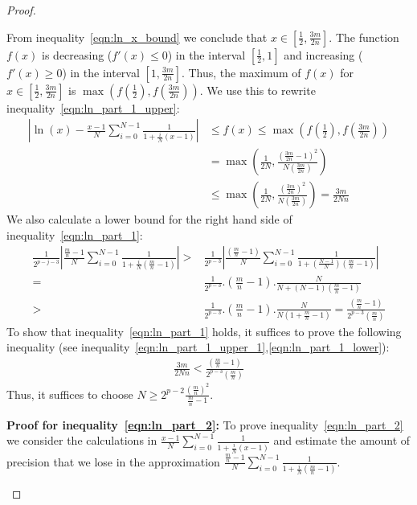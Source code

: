 \documentclass{article}
\numberwithin{mytheorem}{section}
\newcommand{\lnsumu}[2] {\frac{#1-1}{#2} \sum_{i=0}^{#2-1}\frac{1}{1+\frac{i}{#2}(#1-1)}}
\begin{document}
\begin{proof}
\begin{enumerate}[i.]
From inequality~\eqref{eqn:ln_x_bound} we conclude that $x\in [\frac{1}{2},\frac{3m}{2n}]$. The function $f(x)$ is decreasing ($f'(x)\leq 0$) in the interval $[\frac{1}{2},1]$ and increasing ($f'(x)\geq 0$) in the interval $[1,\frac{3m}{2n}]$. Thus, the maximum of $f(x)$ for $x\in [\frac{1}{2},\frac{3m}{2n}]$ is $\max (f(\frac{1}{2}),f(\frac{3m}{2n}))$. We use this to rewrite inequality~\eqref{eqn:ln_part_1_upper}:
\begin{align}
|\ln(x)-\lnsumu{x}{N}|&\leq f(x)\leq \max (f(\frac{1}{2}),f(\frac{3m}{2n}))\nonumber \\ 
&=\max(\frac{1}{2N},\frac{(\frac{3m}{2n}-1)^2}{N(\frac{3m}{2n})})\nonumber\\
&\leq \max (\frac{1}{2N},\frac{(\frac{3m}{2n})^2}{N(\frac{3m}{2n})})=\frac{3m}{2Nn}\label{eqn:ln_part_1_upper_1}
\end{align}
We also calculate a lower bound for the right hand side of inequality~\eqref{eqn:ln_part_1}:
\begin{align}
\frac{1}{2^{p-j-3}}|\lnsumu{\frac{m}{n}}{N}|>&\frac{1}{2^{p-3}}|\frac{(\frac{m}{n}-1)}{N}\sum_{i=0}^{N-1}\frac{1}{1+(\frac{N-1}{N})(\frac{m}{n}-1)}|\nonumber\\
=&\frac{1}{2^{p-3}}.(\frac{m}{n}-1).\frac{N}{N+(N-1)(\frac{m}{n}-1)}\nonumber\\
>&\frac{1}{2^{p-3}}.(\frac{m}{n}-1).\frac{N}{N(1+\frac{m}{n}-1)}=\frac{(\frac{m}{n}-1)}{2^{p-3}(\frac{m}{n})}\label{eqn:ln_part_1_lower}
\end{align}
To show that inequality~\eqref{eqn:ln_part_1} holds, it suffices to prove the following inequality (see inequality~\eqref{eqn:ln_part_1_upper_1},\eqref{eqn:ln_part_1_lower}):
\begin{align*}
\frac{3m}{2Nn}<\frac{(\frac{m}{n}-1)}{2^{p-3}(\frac{m}{n})}
\end{align*}
Thus, it suffices to choose $N\geq 2^{p-2}\frac{(\frac{m}{n})^2}{\frac{m}{n}-1}$.

\textbf{Proof for inequality~\eqref{eqn:ln_part_2}:} To prove inequality~\eqref{eqn:ln_part_2} we consider the calculations in $\lnsumu{x}{N}$ and estimate the amount of precision that we lose in the approximation $\lnsumu{\frac{m}{n}}{N}$.


\end{enumerate}
\end{proof}
\end{document}
